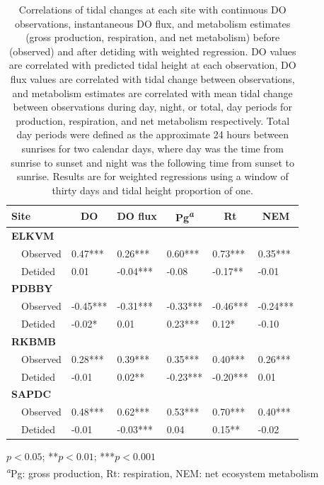 \documentclass[letterpaper,12pt,oneside]{article}\usepackage[]{graphicx}\usepackage[]{color}
\begin{document}
%
\begin{table}[!tbp]
\caption{Correlations of tidal changes at each site with continuous \ac{DO} observations, instantaneous \ac{DO} flux, and metabolism estimates (gross production, respiration, and net metabolism) before (observed) and after detiding with weighted regression.  \ac{DO} values are correlated with predicted tidal height at each observation, \ac{DO} flux values are correlated with tidal change between observations, and metabolism estimates are correlated with mean tidal change between observations during day, night, or total, day periods for production, respiration, and net metabolism respectively.  Total day periods were defined as the approximate 24 hours between sunrises for two calendar days, where day was the time from sunrise to sunset and night was the following time from sunset to sunrise.  Results are for weighted regressions using a window of thirty days and tidal height proportion of one.\label{tab:cor_res}} 
\begin{center}
\begin{tabular}{llllll}
\hline\hline
\multicolumn{1}{l}{Site}&\multicolumn{1}{c}{DO}&\multicolumn{1}{c}{DO flux}&\multicolumn{1}{c}{Pg\textsuperscript{\textit{a}}}&\multicolumn{1}{c}{Rt}&\multicolumn{1}{c}{NEM}\tabularnewline
\hline
{\bfseries ELKVM}&&&&&\tabularnewline
~~Observed& 0.47***& 0.26***& 0.60***& 0.73***& 0.35***\tabularnewline
~~Detided& 0.01 &-0.04***&-0.08 &-0.17**&-0.01 \tabularnewline
\hline
{\bfseries PDBBY}&&&&&\tabularnewline
~~Observed&-0.45***&-0.31***&-0.33***&-0.46***&-0.24***\tabularnewline
~~Detided&-0.02*& 0.01 & 0.23***& 0.12*&-0.10 \tabularnewline
\hline
{\bfseries RKBMB}&&&&&\tabularnewline
~~Observed& 0.28***& 0.39***& 0.35***& 0.40***& 0.26***\tabularnewline
~~Detided&-0.01 & 0.02**&-0.23***&-0.20***& 0.01 \tabularnewline
\hline
{\bfseries SAPDC}&&&&&\tabularnewline
~~Observed& 0.48***& 0.62***& 0.53***& 0.70***& 0.40***\tabularnewline
~~Detided&-0.01 &-0.03***& 0.04 & 0.15**&-0.02 \tabularnewline
\hline
\end{tabular}
\end{center}
\footnotesize *$p<0.05$; **$p<0.01$; ***$p<0.001$\\\textsuperscript{\textit{a}}Pg: gross production, Rt: respiration, NEM: net ecosystem metabolism\end{table}
\end{document}
